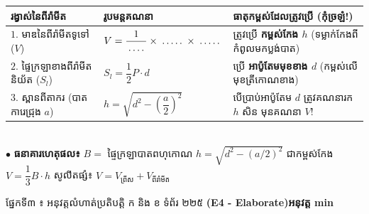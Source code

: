 \documentclass[a4paper,10pt]{article}
\newcommand{\en}[1]{{\TimesEn #1}}
\newcommand{\enbf}[1]{{\TimesEn\textbf{#1}}}
\newcommand{\cnum}[1]{\mbox{\fontsize{10pt}{12pt}\selectfont\ding{\numexpr181+#1\relax}}}
\newcommand{\blank}[1]{\makebox[#1]{\dotfill}}
\newcommand{\secbar}[2]{%
  \vspace{3pt}%
  \begin{tcolorbox}[
    enhanced, sharp corners, colback=headgray, colframe=black,
    boxrule=0.9pt, boxsep=1pt, top=2.5pt, bottom=2.5pt, left=6pt, right=6pt,
    after skip=3pt
  ]
    {\muol\fontsize{9.2pt}{13.5pt}\selectfont #1}\hfill{\fontsize{8.3pt}{11.5pt}\selectfont\textbf{#2}}
  \end{tcolorbox}%
}
\begin{document}
\begin{tcolorbox}[
  enhanced, sharp corners, colback=white, colframe=black,
  boxrule=0.9pt, boxsep=5pt, top=11pt, bottom=11pt, left=6pt, right=6pt
]
  {\renewcommand{\arraystretch}{2.18}\footnotesize
  \begin{tabular}{|L{4.80cm}|L{5.60cm}|L{6.70cm}|}
    \hline
    \textbf{រង្វាស់នៃពីរ៉ាមីត} & \textbf{រូបមន្តគណនា} & \textbf{ធាតុកម្ពស់ដែលត្រូវប្រើ (កុំច្រឡំ!)} \\
    \hline
    $1.$ មាឌនៃពីរ៉ាមីតទូទៅ ($V$) & $V = \dfrac{1}{\blank{0.7cm}} \times \blank{0.9cm} \times \blank{0.9cm}$ & ត្រូវប្រើ \textbf{កម្ពស់កែង $h$} (ទម្លាក់កែងពីកំពូលមកប្លង់បាត) \\
    \hline
    $2.$ ផ្ទៃក្រឡាខាងពីរ៉ាមីតនិយ័ត ($S_l$) & $S_l = \dfrac{1}{2} P \cdot d$ & ប្រើ \textbf{អាប៉ូតែមមុខខាង $d$} (កម្ពស់លើមុខត្រីកោណខាង) \\
    \hline
    $3.$ ស្ពានពីតាករ (បាតការេជ្រុង $a$) & $h = \sqrt{d^2 - \left(\dfrac{a}{2}\right)^2}$ & បើប្រាប់អាប៉ូតែម $d$ ត្រូវគណនារក $h$ សិន មុនគណនា $V$! \\
    \hline
  \end{tabular}}\\[10pt]
  $\bullet$ \textbf{ធនាគារហេតុផល៖}
  \cnum{1} $B =$ ផ្ទៃក្រឡាបាតពហុកោណ \;\textbar\;
  \cnum{2} $h = \sqrt{d^2-(a/2)^2}$ ជាកម្ពស់កែង \;\textbar\;
  \cnum{3} $V = \dfrac{1}{3}B\cdot h$ \;\textbar\;
  \cnum{4} សូលីតផ្សំ៖ $V = V_{\text{ព្រីស}} + V_{\text{ពីរ៉ាមីត}}$
\end{tcolorbox}

\newpage


\secbar{ផ្នែកទី៣ ៖ អនុវត្តលំហាត់ប្រតិបត្តិ ក និង ខ ទំព័រ ២២៥ \enbf{(E4 - Elaborate)}}{អនុវត្ត \en{10 min}}
\end{document}
